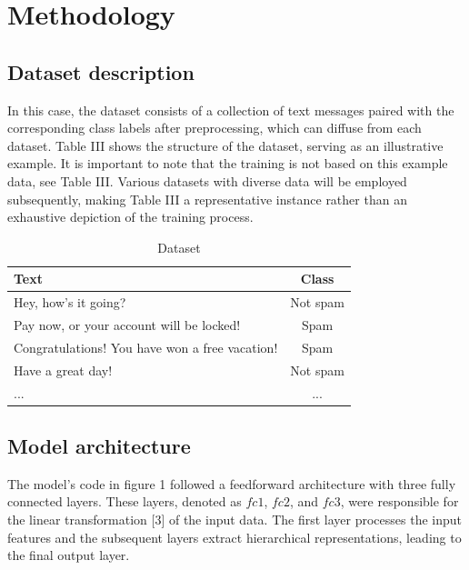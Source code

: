 ﻿\section{Methodology}

\lstset{
  basicstyle=\small\ttfamily,
  captionpos=b,
  frame=single,
  breaklines=true,
  showstringspaces=false,
  aboveskip=2.5pt,
  belowskip=2pt
}

\subsection{Dataset description}
In this case, the dataset consists of a collection of text messages paired with the corresponding class labels after preprocessing, which can diffuse from each dataset.
Table III shows the structure of the dataset, serving as an illustrative example.
It is important to note that the training is not based on this example data, see Table III.
Various datasets with diverse data will be employed subsequently, making Table III a representative instance rather than an exhaustive depiction of the training process.

\begin{table}[htp]
  \begin{center}
  \label{dataset}
  \caption{Dataset}
  \small
  \begin{tabularx}{\columnwidth}{| X | c |}
          \hline
          Text & Class \\
          \hline
          Hey, how's it going? & Not spam \\
          \hline
          Pay now, or your account will be locked! & Spam \\
          \hline
          Congratulations! You have won a free vacation! & Spam \\
          \hline
          Have a great day! & Not spam \\
          \hline
          ... & ... \\
          \hline
      \end{tabularx}
  \end{center}
\end{table}

\subsection{Model architecture}
\indent The model's code in figure 1 followed a feedforward architecture with three fully connected layers.
These layers, denoted as $fc1$, $fc2$, and $fc3$, were responsible for the linear transformation [3] of the input data.
The first layer processes the input features and the subsequent layers extract hierarchical representations, leading to the final output layer. \\

